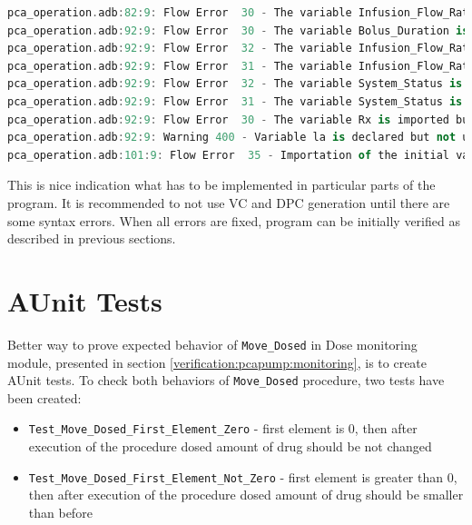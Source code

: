 \singlespacing
\begin{lstlisting}[language=ada, frame=single, gobble=0, caption={Flow errors returned by Examiner for \lstinline{Pca_Operation} package body}, label={listing:verification:pca_generated:flow_errors}]
pca_operation.adb:82:9: Flow Error  30 - The variable Infusion_Flow_Rate is imported but neither referenced nor exported.
pca_operation.adb:92:9: Flow Error  30 - The variable Bolus_Duration is imported but neither referenced nor exported.
pca_operation.adb:92:9: Flow Error  32 - The variable Infusion_Flow_Rate is neither imported nor defined.
pca_operation.adb:92:9: Flow Error  31 - The variable Infusion_Flow_Rate is exported but not (internally) defined.
pca_operation.adb:92:9: Flow Error  32 - The variable System_Status is neither imported nor defined.
pca_operation.adb:92:9: Flow Error  31 - The variable System_Status is exported but not (internally) defined.
pca_operation.adb:92:9: Flow Error  30 - The variable Rx is imported but neither referenced nor exported.
pca_operation.adb:92:9: Warning 400 - Variable la is declared but not used.
pca_operation.adb:101:9: Flow Error  35 - Importation of the initial value of variable Ada.Real_Time.ClockTime is ineffective.
\end{lstlisting}
\doublespacing

This is nice indication what has to be implemented in particular parts of the program. It is recommended to not use VC and DPC generation until there are some syntax errors. When all errors are fixed, program can be initially verified as described in previous sections.


\section{AUnit Tests}
\label{verification:aunit}

Better way to prove expected behavior of \lstinline{Move_Dosed} in Dose monitoring module, presented in section \ref{verification:pcapump:monitoring}, is to create AUnit tests. To check both behaviors of \lstinline{Move_Dosed} procedure, two tests have been created:
\begin{itemize}
    \item \lstinline{Test_Move_Dosed_First_Element_Zero} - first element is 0, then after execution of the procedure dosed amount of drug should be not changed
    \item \lstinline{Test_Move_Dosed_First_Element_Not_Zero} - first element is greater than 0, then after execution of the procedure dosed amount of drug should be smaller than before
\end{itemize}

